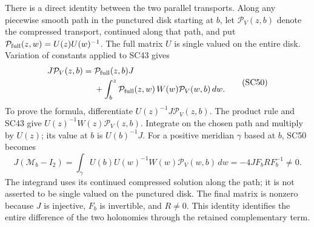 \documentclass[11pt,a4paper]{article}
\theoremstyle{definition}\newtheorem{definition}[theorem]{Definition}
\begin{document}
There is a direct identity between the two parallel transports.
Along any piecewise smooth path in the punctured disk starting
at \(b\), let \(\mathcal P_V(z,b)\) denote the compressed
transport, continued along that path, and put
\(\mathcal P_{\rm full}(z,w)=U(z)U(w)^{-1}\).
The full matrix \(U\) is single valued on the entire disk.
Variation of constants applied to SC43 gives
\[
 \begin{split}
 J\mathcal P_V(z,b)
   ={}&\mathcal P_{\rm full}(z,b)J\\
    &+\int_b^z
      \mathcal P_{\rm full}(z,w)\,
      W(w)\mathcal P_V(w,b)\,dw .
 \end{split}\tag{SC50}
\]
To prove the formula, differentiate
\(U(z)^{-1}J\mathcal P_V(z,b)\). The product rule and SC43
give \(U(z)^{-1}W(z)\mathcal P_V(z,b)\). Integrate on the
chosen path and multiply by \(U(z)\); its value at \(b\)
is \(U(b)^{-1}J\). For a positive meridian \(\gamma\) based
at \(b\), SC50 becomes
\[
 J(\mathcal M_b-I_2)
   =\int_\gamma U(b)U(w)^{-1}W(w)
          \mathcal P_V(w,b)\,dw
   =-4JF_bRF_b^{-1}\ne0 .
 \tag{SC51}
\]
The integrand uses its continued compressed solution along
the path; it is not asserted to be single valued on the
punctured disk. The final matrix is nonzero because \(J\)
is injective, \(F_b\) is invertible, and \(R\ne0\).
This identity identifies the entire difference of the two
holonomies through the retained complementary term.
\end{document}
